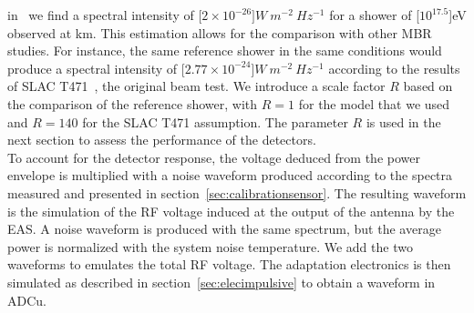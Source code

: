 in~\cite{imen2016}  we  find a  spectral  intensity of  \unit[$\mathrm
  2\times10^{-26}]{W   \  m^{-2}   \   Hz^{-1}}$  for   a  shower   of
\unit[$10^{17.5}$]{eV}  observed  at  \unit[10]{km}.  This  estimation
allows for  the comparison with  other MBR studies. For  instance, the
same reference shower in the  same conditions would produce a spectral
intensity of \unit[$\mathrm 2.77\times10^{-24}]{W \ m^{-2} \ Hz^{-1}}$
according to the results of SLAC T471~\cite{Gorham}, the original beam
test. We introduce  a scale factor $R$ based on  the comparison of the
reference shower,  with $R=1$ for the  model that we  used and $R=140$
for the  SLAC T471 assumption. The  parameter $R$ is used  in the next
section to  assess the performance  of the detectors.\\To  account for
the detector response, the voltage  deduced from the power envelope is
multiplied  with a noise  waveform produced  according to  the spectra
measured  and presented  in  section~\ref{sec:calibrationsensor}.  The
resulting waveform is the simulation  of the RF voltage induced at the
output of the  antenna by the EAS.  A noise  waveform is produced with
the same spectrum, but the average power is normalized with the system
noise temperature.  We add the  two waveforms to emulates the total RF
voltage.  The adaptation electronics is then simulated as described in
section~\ref{sec:elecimpulsive} to obtain a waveform in ADCu.
